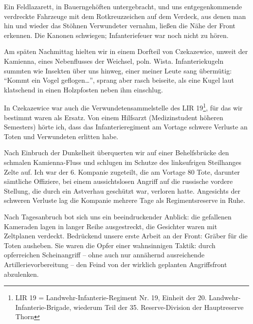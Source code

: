 Ein Feldlazarett, in Bauerngehöften untergebracht, und uns entgegenkommende verdreckte Fahrzeuge mit dem Rotkreuzzeichen auf dem Verdeck, aus denen man hin und wieder das Stöhnen Verwundeter vernahm, ließen die Nähe der Front erkennen. Die Kanonen schwiegen; Infanteriefeuer war noch nicht zu hören.

Am späten Nachmittag hielten wir in einem Dorfteil von Czekazewice, unweit der Kamienna, eines Nebenflusses der Weichsel, poln. Wista. Infanteriekugeln summten wie Insekten über uns hinweg, einer meiner Leute sang übermütig: \enquote{Kommt ein Vogel geflogen\dots}, sprang aber rasch beiseite, als eine Kugel laut klatschend in einen Holzpfosten neben ihm einschlug.

In Czekazewice war auch die Verwundetensammelstelle des LIR 19\footnote{LIR 19 = Landwehr-Infanterie-Regiment Nr. 19, Einheit der 20. Landwehr-Infanterie-Brigade, wiederum Teil der 35. Reserve-Division der Hauptreserve Thorn}, für das wir bestimmt waren als Ersatz. Von einem Hilfsarzt (Medizinstudent höheren Semesters) hörte ich, dass das Infanterieregiment am Vortage schwere Verluste an Toten und Verwundeten erlitten habe.

Nach Einbruch der Dunkelheit überquerten wir auf einer Behelfsbrücke den schmalen Kamienna-Fluss und schlugen im Schutze des linksufrigen Steilhanges Zelte auf. Ich war der 6. Kompanie zugeteilt, die am Vortage 80 Tote, darunter sämtliche Offiziere, bei einem aussichtslosen Angriff auf die russische vordere Stellung, die durch ein Astverhau geschützt war, verloren hatte. Angesichts der schweren Verluste lag die Kompanie mehrere Tage als Regimentsreserve in Ruhe.

Nach Tagesanbruch bot sich uns ein beeindruckender Anblick: die gefallenen Kameraden lagen in langer Reihe ausgestreckt, die Gesichter waren mit Zeltplanen verdeckt. Bedrückend unsere erste Arbeit an der Front: Gräber für die Toten ausheben. Sie waren die Opfer einer wahnsinnigen Taktik: durch opferreichen Scheinangriff -- ohne auch nur annähernd ausreichende Artillerievorbereitung -- den Feind von der wirklich geplanten Angriffsfront abzulenken.

